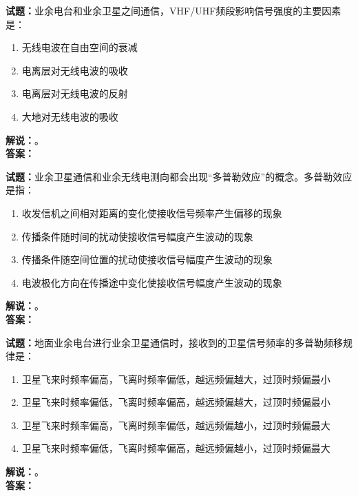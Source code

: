 \documentclass{ctexbook}
\begin{document}
\vspace{\baselineskip}

\noindent\textbf{试题：}业余电台和业余卫星之间通信，VHF/UHF频段影响信号强度的主要因素是：
\begin{enumerate}[leftmargin=3em]
  \item 无线电波在自由空间的衰减
  \item 电离层对无线电波的吸收
  \item 电离层对无线电波的反射
  \item 大地对无线电波的吸收
\end{enumerate}
\noindent\textbf{解说：}\textbf{}。\\\noindent\textbf{答案：}

\vspace{\baselineskip}

\noindent\textbf{试题：}业余卫星通信和业余无线电测向都会出现“多普勒效应”的概念。多普勒效应是指：
\begin{enumerate}[leftmargin=3em]
  \item 收发信机之间相对距离的变化使接收信号频率产生偏移的现象
  \item 传播条件随时间的扰动使接收信号幅度产生波动的现象
  \item 传播条件随空间位置的扰动使接收信号幅度产生波动的现象
  \item 电波极化方向在传播途中变化使接收信号幅度产生波动的现象
\end{enumerate}
\noindent\textbf{解说：}\textbf{}。\\\noindent\textbf{答案：}

\vspace{\baselineskip}

\noindent\textbf{试题：}地面业余电台进行业余卫星通信时，接收到的卫星信号频率的多普勒频移规律是：
\begin{enumerate}[leftmargin=3em]
  \item 卫星飞来时频率偏高，飞离时频率偏低，越远频偏越大，过顶时频偏最小
  \item 卫星飞来时频率偏低，飞离时频率偏高，越远频偏越大，过顶时频偏最小
  \item 卫星飞来时频率偏高，飞离时频率偏低，越远频偏越小，过顶时频偏最大
  \item 卫星飞来时频率偏低，飞离时频率偏高，越远频偏越小，过顶时频偏最大
\end{enumerate}
\noindent\textbf{解说：}\textbf{}。\\\noindent\textbf{答案：}

\vspace{\baselineskip}
\end{document}
